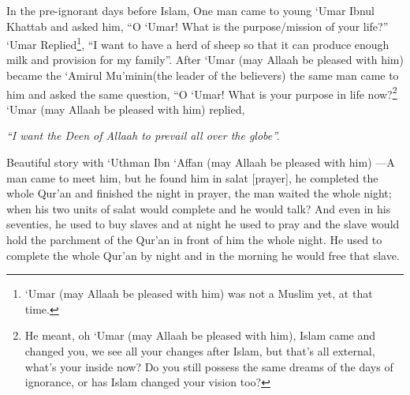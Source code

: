 {In the pre-ignorant days before Islam, One man came to young ‘Umar Ibnul Khattab and asked him, “O ‘Umar! What is the purpose/mission of your life?” ‘Umar Replied\footnote{‘Umar (may Allaah be pleased with him) was not a Muslim yet, at that time.
}, “I want to have a herd of sheep so that it can produce enough milk and provision for my family”. After ‘Umar (may Allaah be pleased with him) became the ‘Amirul Mu’minin(the leader of the believers) the same man came to him and asked the same question, “O ‘Umar! What is your purpose in life now?\footnote{He meant, oh ‘Umar (may Allaah be pleased with him), Islam came and changed you, we see all your changes after Islam, but that’s all external, what's your inside now? Do you still possess the same dreams of the days of ignorance, or has Islam changed your vision too?} ‘Umar (may Allaah be pleased with him) replied, 
\begin{center}
    \textit{
        “I want the Deen of Allaah to prevail all over the globe”. }
\end{center}
\par Beautiful story with ‘Uthman Ibn ‘Affan (may Allaah be pleased with him)  ---A man came to meet him, but he found him in salat [prayer], he completed the whole Qur’an and finished the night in prayer, the man waited the whole night; when his two units of salat would complete and he would talk? And even in his seventies, he used to buy slaves and at night he used to pray and the slave would hold the parchment of the Qur'an in front of him the whole night. He used to complete the whole Qur'an by night and in the morning he would free that slave. 
}